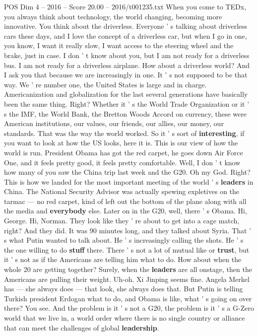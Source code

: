\begin{textsample}{POS Dim 4 – 2016 – Score 20.00 – 2016/t001235.txt}  \label{ex:f4_pos_041}
When you come to TEDx, you always think about technology, the world changing, becoming more innovative.
You think about the driverless.
Everyone ' s talking about driverless cars these days, and I love the concept of a driverless car, but when I go in one, you know, I want it really slow, I want access to the steering wheel and the brake, just in case.
I don ' t know about you, but I am not ready for a driverless bus.
I am not ready for a driverless airplane.
How about a driverless world?
And I ask you that because we are increasingly in one.
It ' s not supposed to be that way.
We ' re number one, the United States is large and in charge.
Americanization and globalization for the last several generations have basically been the same thing.
Right?
Whether it ' s the World Trade Organization or it ' s the IMF, the World Bank, the Bretton Woods Accord on currency, these were American institutions, our values, our friends, our allies, our money, our standards.
That was the way the world worked.
So it ' s sort of \textbf{interesting}, if you want to look at how the US looks, here it is.
This is our view of how the world is run.
President Obama has got the red carpet, he goes down Air Force One, and it feels pretty good, it feels pretty comfortable.
Well, I don ' t know how many of you saw the China trip last week and the G20.
Oh my God.
Right?
This is how we landed for the most important meeting of the world ' s \textbf{leaders} in China.
The National Security Advisor was actually spewing expletives on the tarmac — no red carpet, kind of left out the bottom of the plane along with all the media and \textbf{everybody} else.
Later on in the G20, well, there ' s Obama.
Hi, George.
Hi, Norman.
They look like they ' re about to get into a cage match, right?
And they did.
It was 90 minutes long, and they talked about Syria.
That ' s what Putin wanted to talk about.
He ' s increasingly calling the shots.
He ' s the one willing to do \textbf{stuff} there.
There ' s not a lot of mutual like or \textbf{trust}, but it ' s not as if the Americans are telling him what to do.
How about when the whole 20 are getting together?
Surely, when the \textbf{leaders} are all onstage, then the Americans are pulling their weight.
Uh-oh.
Xi Jinping seems fine.
Angela Merkel has — she always does — that look, she always does that.
But Putin is telling Turkish president Erdogan what to do, and Obama is like, what ' s going on over there?
You see.
And the problem is it ' s not a G20, the problem is it ' s a G-Zero world that we live in, a world order where there is no single country or alliance that can meet the challenges of global \textbf{leadership}.

\end{textsample}
